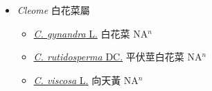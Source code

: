 
  \begin{itemize}
 \item[] \textit{Cleome} 白花菜屬
                    
  \begin{itemize}
        \item[] \href{http://www.theplantlist.org/tpl1.1/search?q=Cleome+gynandra}{\textit{C. gynandra} L.}   白花菜 NA$^n$
        \item[] \href{http://www.theplantlist.org/tpl1.1/search?q=Cleome+rutidosperma}{\textit{C. rutidosperma} DC.}   平伏莖白花菜 NA$^n$
        \item[] \href{http://www.theplantlist.org/tpl1.1/search?q=Cleome+viscosa}{\textit{C. viscosa} L.}   向天黃 NA$^n$
  \end{itemize}
  \end{itemize}
